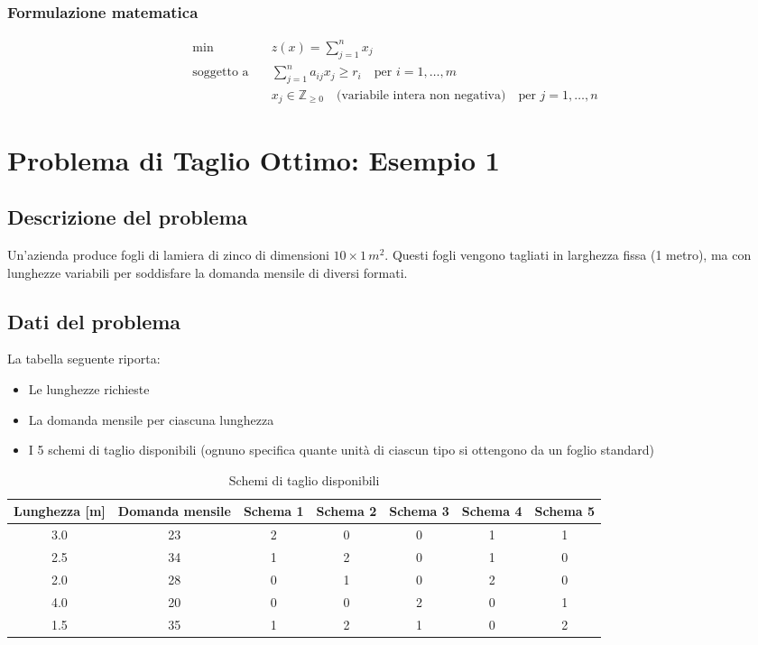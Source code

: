 \subsubsection{Formulazione matematica}
\[
\begin{aligned}
\min \quad & z(x) = \sum_{j=1}^{n} x_j \\
\text{soggetto a} \quad & \sum_{j=1}^{n} a_{ij} x_j \geq r_i \quad \text{per } i = 1, \dots, m \\
& x_j \in \mathbb{Z}_{\geq 0} \quad \text{(variabile intera non negativa)} \quad \text{per } j = 1, \dots, n
\end{aligned}
\]

\section{Problema di Taglio Ottimo: Esempio 1}
\subsection{Descrizione del problema}

Un'azienda produce fogli di lamiera di zinco di dimensioni 
$10 \times 1\, m^2$. Questi fogli vengono tagliati in larghezza fissa (1 metro), 
ma con lunghezze variabili per soddisfare la domanda mensile di diversi formati.

\subsection{Dati del problema}

La tabella seguente riporta:
\begin{itemize}
    \item Le lunghezze richieste
    \item La domanda mensile per ciascuna lunghezza
    \item I 5 schemi di taglio disponibili (ognuno specifica quante unità di ciascun tipo si ottengono da un foglio standard)
\end{itemize}

\begin{table}[htbp]
    \centering
    \caption{Schemi di taglio disponibili}
    \begin{tabular}{|c|c|c|c|c|c|c|}
        \hline
        \textbf{Lunghezza [m]} & \textbf{Domanda mensile} & \textbf{Schema 1} & \textbf{Schema 2} & \textbf{Schema 3} & \textbf{Schema 4} & \textbf{Schema 5} \\
        \hline
        3.0 & 23 & 2 & 0 & 0 & 1 & 1 \\
        2.5 & 34 & 1 & 2 & 0 & 1 & 0 \\
        2.0 & 28 & 0 & 1 & 0 & 2 & 0 \\
        4.0 & 20 & 0 & 0 & 2 & 0 & 1 \\
        1.5 & 35 & 1 & 2 & 1 & 0 & 2 \\
        \hline
    \end{tabular}
\end{table}

